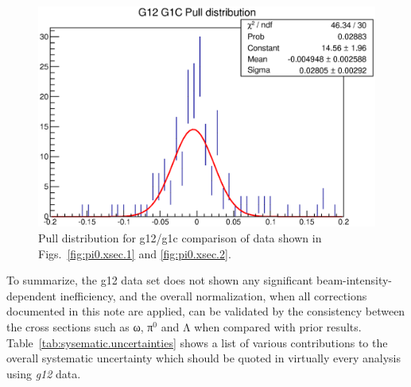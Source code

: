 \begin{figure}[htpb]\begin{center}
\includegraphics[width=0.7\columnwidth]{figures/xsec/G12_Pi0_XSection_pull.eps}
\caption{\label{fig:pi0.xsec.pull}Pull distribution for g12/g1c comparison of data shown in Figs.~\ref{fig:pi0.xsec.1} and \ref{fig:pi0.xsec.2}.}
\end{center}\end{figure}

To summarize, the g12 data set does not shown any significant beam-intensity-dependent inefficiency, and the overall normalization, when all corrections documented in this note are applied, can be validated by the consistency between the cross sections such as ω, π$^0$ and Λ when compared with prior results. Table~\ref{tab:sysematic.uncertainties} shows a list of various contributions to the overall systematic uncertainty which should be quoted in virtually every analysis using \emph{g12} data.


